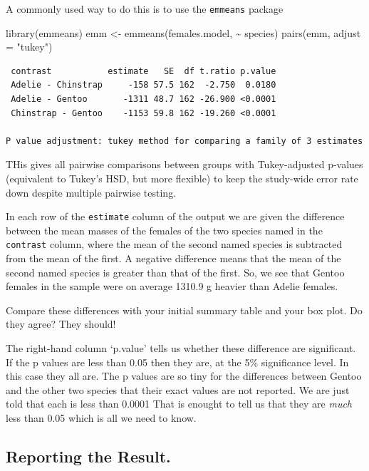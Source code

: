 \documentclass[
  letterpaper,
  DIV=11,
  numbers=noendperiod]{scrreprt}
\newenvironment{Shaded}{\begin{snugshade}}{\end{snugshade}}
\newcommand{\AttributeTok}[1]{\textcolor[rgb]{0.40,0.45,0.13}{#1}}
\newcommand{\FunctionTok}[1]{\textcolor[rgb]{0.28,0.35,0.67}{#1}}
\newcommand{\NormalTok}[1]{\textcolor[rgb]{0.00,0.23,0.31}{#1}}
\newcommand{\OtherTok}[1]{\textcolor[rgb]{0.00,0.23,0.31}{#1}}
\newcommand{\SpecialCharTok}[1]{\textcolor[rgb]{0.37,0.37,0.37}{#1}}
\newcommand{\StringTok}[1]{\textcolor[rgb]{0.13,0.47,0.30}{#1}}
\begin{document}
A commonly used way to do this is to use the \texttt{emmeans} package

\begin{Shaded}
\begin{Highlighting}[]
\FunctionTok{library}\NormalTok{(emmeans)}
\NormalTok{emm }\OtherTok{\textless{}{-}} \FunctionTok{emmeans}\NormalTok{(females.model, }\SpecialCharTok{\textasciitilde{}}\NormalTok{ species)}
\FunctionTok{pairs}\NormalTok{(emm, }\AttributeTok{adjust =} \StringTok{"tukey"}\NormalTok{)}
\end{Highlighting}
\end{Shaded}

\begin{verbatim}
 contrast           estimate   SE  df t.ratio p.value
 Adelie - Chinstrap     -158 57.5 162  -2.750  0.0180
 Adelie - Gentoo       -1311 48.7 162 -26.900 <0.0001
 Chinstrap - Gentoo    -1153 59.8 162 -19.260 <0.0001

P value adjustment: tukey method for comparing a family of 3 estimates 
\end{verbatim}

THis gives all pairwise comparisons between groups with Tukey-adjusted
p-values (equivalent to Tukey's HSD, but more flexible) to keep the
study-wide error rate down despite multiple pairwise testing.

In each row of the \texttt{estimate} column of the output we are given
the difference between the mean masses of the females of the two species
named in the \texttt{contrast} column, where the mean of the second
named species is subtracted from the mean of the first. A negative
difference means that the mean of the second named species is greater
than that of the first. So, we see that Gentoo females in the sample
were on average 1310.9 g heavier than Adelie females.

Compare these differences with your initial summary table and your box
plot. Do they agree? They should!

The right-hand column `p.value' tells us whether these difference are
significant. If the p values are less than 0.05 then they are, at the
5\% significance level. In this case they all are. The p values are so
tiny for the differences between Gentoo and the other two species that
their exact values are not reported. We are just told that each is less
than 0.0001 That is enought to tell us that they are \emph{much} less
than 0.05 which is all we need to know.

\subsection{Reporting the Result.}\label{reporting-the-result.}
\end{document}
